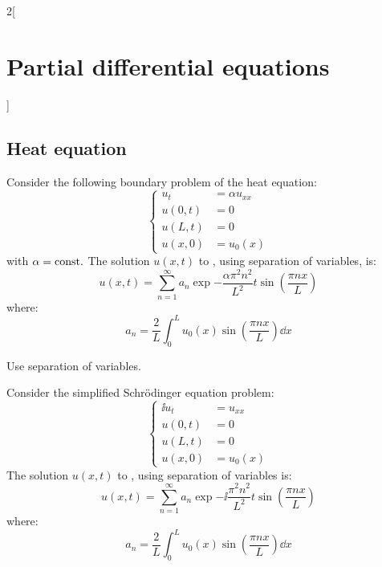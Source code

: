 \documentclass[../../../main_math.tex]{subfiles}
\begin{document}
\begin{multicols}{2}[\section{Partial differential equations}]
  \subsection{Heat equation}
  \begin{proposition}
    Consider the following boundary problem of the heat equation:
    \begin{equation}\label{PDE:heat-fixedendpoints}
      \left\{
      \begin{aligned}
        u_{t}  & =\alpha u_{xx} \\
        u(0,t) & =0             \\
        u(L,t) & =0             \\
        u(x,0) & =u_0(x)
      \end{aligned}
      \right.
    \end{equation}
    with $\alpha=\text{const.}$
    The solution $u(x,t)$ to , using separation of variables, is: $$u(x,t)=\sum_{n=1}^\infty a_n\exp{-\frac{\alpha\pi^2n^2}{L^2}t}\sin\left(\frac{\pi n x}{L}\right)$$ where:
    \begin{equation*}
      a_n =\frac{2}{L}\int_{0}^Lu_0(x)\sin\left(\frac{\pi n x}{L}\right)\dd{x}
    \end{equation*}
  \end{proposition}
  \begin{sproof}
    Use separation of variables.
  \end{sproof}
  \begin{proposition}
    Consider the simplified Schrödinger equation problem:
    \begin{equation}\label{PDE:schro-fixedendpoints}
      \left\{
      \begin{aligned}
        \ii u_{t} & =u_{xx} \\
        u(0,t)    & =0      \\
        u(L,t)    & =0      \\
        u(x,0)    & =u_0(x)
      \end{aligned}
      \right.
    \end{equation}
    The solution $u(x,t)$ to , using separation of variables is: $$u(x,t)=\sum_{n=1}^\infty a_n\exp{-\ii\frac{\pi^2n^2}{L^2}t}\sin\left(\frac{\pi n x}{L}\right)$$ where:
    \begin{equation*}
      a_n =\frac{2}{L}\int_{0}^Lu_0(x)\sin\left(\frac{\pi n x}{L}\right)\dd{x}
    \end{equation*}
  \end{proposition}

\end{multicols}
\end{document}
